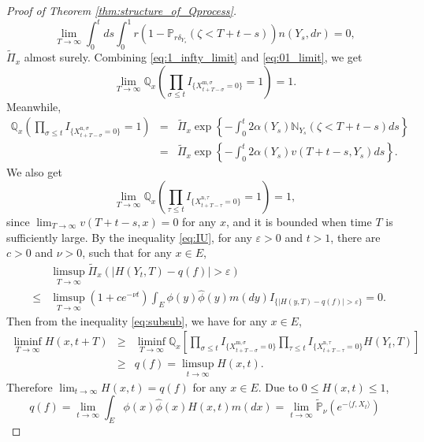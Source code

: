\documentclass[12pt,a4paper]{amsart}
\numberwithin{equation}{section}
\theoremstyle{plain}
\theoremstyle{definition}
\begin{document}
\begin{proof}[Proof of Theorem \ref{thm:structure_of_Qprocess}]
\begin{equation}
    \lim_{T\rightarrow\infty}\int_0^tds\int_0^1 r(1-\mathbb P_{r\delta_{Y_s}}(\zeta<T+t-s))n(Y_s,dr)=0,
  \end{equation}
  $\widetilde\Pi_x$ almost surely.  Combining \eqref{eq:1_infty_limit} and \eqref{eq:01_limit}, we get
  \[
    \lim_{T\rightarrow\infty}\mathbb Q_{x}\left(\prod_{\sigma\leq t}I_{\{ X_{t+T-\sigma}^{{\mathrm m},\sigma}=0\}}=1\right)=1.
  \]
  Meanwhile,
  \begin{eqnarray*}
    \mathbb Q_x\left(\prod_{\sigma\leq t}I_{\{ X_{t+T-\sigma}^{{\mathrm n},\sigma}=0\}}=1\right)
    &=&\widetilde\Pi_x\exp\left\{-\int_0^t2\alpha(Y_s)\mathbb N_{Y_s}(\zeta<T+t-s)ds\right\}\\
    &=&\widetilde\Pi_x\exp\left\{-\int_0^t2\alpha(Y_s)v(T+t-s,Y_s)ds\right\}.
  \end{eqnarray*}
  We also get
  \[
    \lim_{T\rightarrow\infty}\mathbb Q_x\left(\prod_{\tau\leq t}I_{\{ X_{t+T-\tau}^{{\mathrm n},\tau}=0\}}=1\right)=1,
  \]
  since $\lim_{T\rightarrow\infty} v(T+t-s,x)=0$ for any $x$, and it is bounded when time $T$ is sufficiently large.  By the inequality \eqref{eq:IU}, for any $\varepsilon>0$ and $t>1$, there are $c>0$ and $\nu>0$, such that for any $x\in E$,
  \begin{eqnarray*}
    &&\limsup_{T\rightarrow\infty}\widetilde\Pi_x\left(|H(Y_t, T)-q(f)|>\varepsilon\right)\\
    &\leq& \limsup_{T\rightarrow\infty}(1+ce^{-\nu t})\int_E\phi(y)\widehat\phi(y)m(dy)I_{\{|H(y, T)-q(f)|>\varepsilon\}}=0.
  \end{eqnarray*}
  Then from the inequality \eqref{eq:subsub}, we have for any $x\in E$,
  \begin{eqnarray*}
    \liminf_{T\rightarrow\infty}H(x, t+T)&\geq&  \liminf_{T\rightarrow\infty} \mathbb Q_x\left[\prod_{\sigma\leq t}I_{\{ X_{t+T-\sigma}^{{\mathrm m},\sigma}=0\}}\prod_{\tau\leq t}I_{\{ X_{t+T-\tau}^{{\mathrm n},\tau}=0\}}H(Y_t, T)\right]\\
                                         &\geq& q(f)=\limsup_{t\rightarrow\infty}H(x, t).
  \end{eqnarray*}
  Therefore  $\lim_{t\rightarrow\infty}H(x, t)=q(f)$ for any $x\in E$.
  Due to $0\leq H(x,t)\leq 1$,
  \begin{equation*}
    q(f)=\lim_{t\rightarrow\infty}\int_E\phi(x)\widehat\phi(x)H(x,t)m(dx)
    =\lim_{t\rightarrow\infty}\widetilde{\mathbb P}_{\nu}\left(e^{-\langle f, X_t\rangle }\right)

\end{equation*}
\end{proof}
\end{document}
